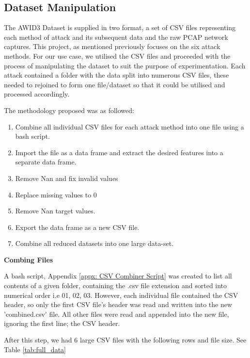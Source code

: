 \subsection{Dataset Manipulation}

The AWID3 Dataset \parencite{9360747} is supplied in two format, a set of CSV files representing each method of attack and its subsequent data and the raw PCAP network captures. This project, as mentioned previously focuses on the six attack methods. For our use case, we utilised the CSV files and proceeded with the process of manipulating the dataset to suit the purpose of experimentation. Each attack contained a folder with the data split into numerous CSV files, these needed to rejoined to form one file/dataset so that it could be utilised and processed accordingly. 

\medskip
The methodology proposed was as followed:
\begin{enumerate}
    \item Combine all individual CSV files for each attack method into one file using a bash script.
    \item Import the file as a data frame and extract the desired features into a separate data frame.
    \item Remove Nan and fix invalid values
    \item Replace missing values to 0
    \item Remove Nan target values.
    \item Export the data frame as a new CSV file.
    \item Combine all reduced datasets into one large data-set.
\end{enumerate}

\medskip

\textbf{Combing Files}

\smallskip
A bash script, Appendix \ref{appx: CSV Combiner Script} was created to list all contents of a given folder, containing the .csv file extension and sorted into numerical order i.e 01, 02, 03. However, each individual file contained the CSV header, so only the first CSV file's header was read and written into the new 'combined.csv' file. All other files were read and appended into the new file, ignoring the first line; the CSV header. 

After this step, we had 6 large CSV files with the following rows and file size. See Table \ref{tab:full_data}

